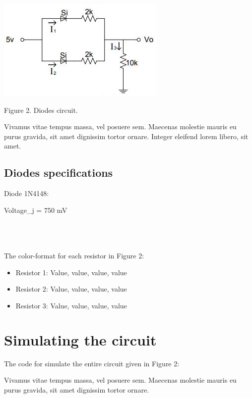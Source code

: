 \documentclass[article]{IEEEtran}
\begin{document}
\begin{center}
\includegraphics[scale=0.65]{fig2.JPG}

Figure 2. Diodes circuit.
\end{center}

Vivamus vitae tempus massa, vel posuere sem. Maecenas molestie mauris eu purus gravida, sit amet dignissim tortor ornare. Integer eleifend lorem libero, sit amet.

\subsection*{Diodes specifications}

Diode 1N4148:

\begin{list}
    \item {Voltage_j = 750 mV}
\end{list}
\\
\\
\\
The color-format for each resistor in Figure 2:
\begin{itemize}
    \item Resistor 1: 
    Value, value, value, value
    \item Resistor 2: 
    Value, value, value, value
    \item Resistor 3:
    Value, value, value, value
\end{itemize}
\section*{Simulating the circuit}
The code for simulate the entire circuit given in Figure 2: 

Vivamus vitae tempus massa, vel posuere sem. Maecenas molestie mauris eu purus gravida, sit amet dignissim tortor ornare. 
\end{document}
